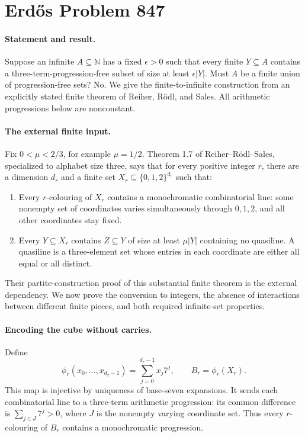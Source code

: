 \section*{Erd\H{o}s Problem 847}

\paragraph{Statement and result.}
Suppose an infinite \(A\subseteq\mathbb N\) has a fixed \(\epsilon>0\) such that every finite \(Y\subseteq A\) contains a three-term-progression-free subset of size at least \(\epsilon|Y|\). Must \(A\) be a finite union of progression-free sets? No. We give the finite-to-infinite construction from an explicitly stated finite theorem of Reiher, R\"odl, and Sales. All arithmetic progressions below are nonconstant.

\paragraph{The external finite input.}
Fix \(0<\mu<2/3\), for example \(\mu=1/2\). Theorem 1.7 of Reiher--R\"odl--Sales, specialized to alphabet size three, says that for every positive integer \(r\), there are a dimension \(d_r\) and a finite set \(X_r\subseteq\{0,1,2\}^{d_r}\) such that:
\begin{enumerate}
\item Every \(r\)-colouring of \(X_r\) contains a monochromatic combinatorial line: some nonempty set of coordinates varies simultaneously through \(0,1,2\), and all other coordinates stay fixed.
\item Every \(Y\subseteq X_r\) contains \(Z\subseteq Y\) of size at least \(\mu|Y|\) containing no quasiline. A quasiline is a three-element set whose entries in each coordinate are either all equal or all distinct.
\end{enumerate}
Their partite-construction proof of this substantial finite theorem is the external dependency. We now prove the conversion to integers, the absence of interactions between different finite pieces, and both required infinite-set properties.

\paragraph{Encoding the cube without carries.}
Define
\[
 \phi_r(x_0,\ldots,x_{d_r-1})=
 \sum_{j=0}^{d_r-1}x_j7^j,
 \qquad B_r=\phi_r(X_r).
\]
This map is injective by uniqueness of base-seven expansions. It sends each combinatorial line to a three-term arithmetic progression: its common difference is \(\sum_{j\in J}7^j>0\), where \(J\) is the nonempty varying coordinate set. Thus every \(r\)-colouring of \(B_r\) contains a monochromatic progression.

